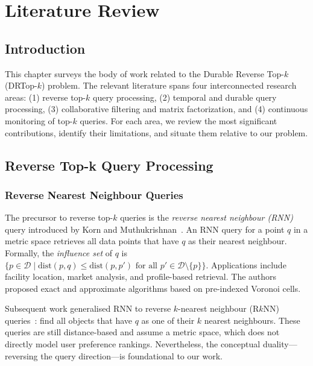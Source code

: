 \chapter{Literature Review}
\label{ch:literature}

\section{Introduction}

This chapter surveys the body of work related to the Durable Reverse Top-$k$ (DRTop-$k$) problem. The relevant literature spans four interconnected research areas: (1) reverse top-$k$ query processing, (2) temporal and durable query processing, (3) collaborative filtering and matrix factorization, and (4) continuous monitoring of top-$k$ queries. For each area, we review the most significant contributions, identify their limitations, and situate them relative to our problem.

\section{Reverse Top-k Query Processing}

\subsection{Reverse Nearest Neighbour Queries}

The precursor to reverse top-$k$ queries is the \textit{reverse nearest neighbour (RNN)} query introduced by Korn and Muthukrishnan~\cite{korn2000influence}. An RNN query for a point $q$ in a metric space retrieves all data points that have $q$ as their nearest neighbour. Formally, the \textit{influence set} of $q$ is $\{p \in \mathcal{D} \mid \text{dist}(p, q) \leq \text{dist}(p, p') \text{ for all } p' \in \mathcal{D} \setminus \{p\}\}$. Applications include facility location, market analysis, and profile-based retrieval. The authors proposed exact and approximate algorithms based on pre-indexed Voronoi cells.

Subsequent work generalised RNN to reverse $k$-nearest neighbour (R$k$NN) queries~\cite{tao2004reverse}: find all objects that have $q$ as one of their $k$ nearest neighbours. These queries are still distance-based and assume a metric space, which does not directly model user preference rankings. Nevertheless, the conceptual duality---reversing the query direction---is foundational to our work.


